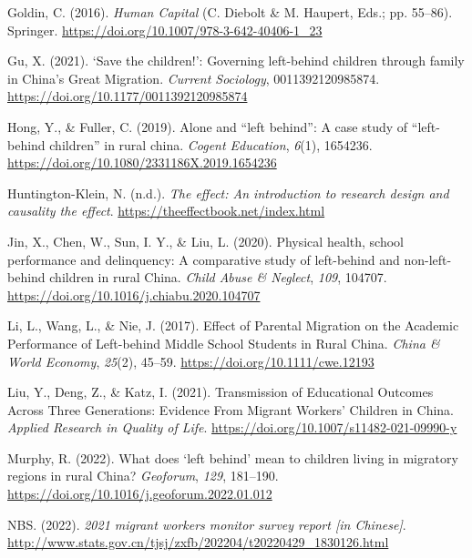 \documentclass[
  man,floatsintext]{apa7}
\newlength{\cslhangindent}
\newlength{\cslentryspacingunit} %
\newenvironment{CSLReferences}[2] %
 {%
  \setlength{\parindent}{0pt}
  \ifodd #1
  \let\oldpar\par
  \def\par{\hangindent=\cslhangindent\oldpar}
  \fi
  \setlength{\parskip}{#2\cslentryspacingunit}
 }%
 {}
\begin{document}
\begin{CSLReferences}{1}{0}
\leavevmode{}%
Goldin, C. (2016). \emph{Human Capital} (C. Diebolt \& M. Haupert, Eds.; pp. 55--86). Springer. \url{https://doi.org/10.1007/978-3-642-40406-1_23}

\leavevmode{}%
Gu, X. (2021). {`}Save the children!{'}: Governing left-behind children through family in China{'}s Great Migration. \emph{Current Sociology}, 0011392120985874. \url{https://doi.org/10.1177/0011392120985874}

\leavevmode{}%
Hong, Y., \& Fuller, C. (2019). Alone and {``}left behind{''}: A case study of {``}left-behind children{''} in rural china. \emph{Cogent Education}, \emph{6}(1), 1654236. \url{https://doi.org/10.1080/2331186X.2019.1654236}

\leavevmode{}%
Huntington-Klein, N. (n.d.). \emph{The effect: An introduction to research design and causality \textbar{} the effect}. \url{https://theeffectbook.net/index.html}

\leavevmode{}%
Jin, X., Chen, W., Sun, I. Y., \& Liu, L. (2020). Physical health, school performance and delinquency: A comparative study of left-behind and non-left-behind children in rural China. \emph{Child Abuse \& Neglect}, \emph{109}, 104707. \url{https://doi.org/10.1016/j.chiabu.2020.104707}

\leavevmode{}%
Li, L., Wang, L., \& Nie, J. (2017). Effect of Parental Migration on the Academic Performance of Left-behind Middle School Students in Rural China. \emph{China \& World Economy}, \emph{25}(2), 45--59. \url{https://doi.org/10.1111/cwe.12193}

\leavevmode{}%
Liu, Y., Deng, Z., \& Katz, I. (2021). Transmission of Educational Outcomes Across Three Generations: Evidence From Migrant Workers{'} Children in China. \emph{Applied Research in Quality of Life}. \url{https://doi.org/10.1007/s11482-021-09990-y}

\leavevmode{}%
Murphy, R. (2022). What does {`}left behind{'} mean to children living in migratory regions in rural China? \emph{Geoforum}, \emph{129}, 181--190. \url{https://doi.org/10.1016/j.geoforum.2022.01.012}

\leavevmode{}%
NBS. (2022). \emph{2021 migrant workers monitor survey report {[}in Chinese{]}}. \url{http://www.stats.gov.cn/tjsj/zxfb/202204/t20220429_1830126.html}


\end{CSLReferences}
\end{document}
